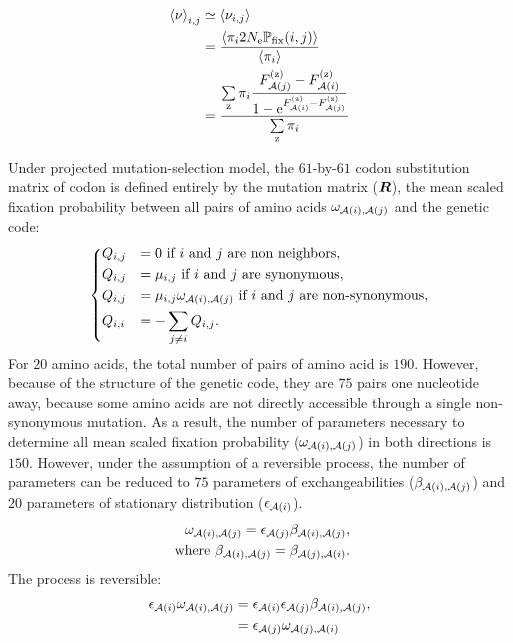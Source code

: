 \begin{align}
    \left\langle \nu \right\rangle_{{i}, {j}} & \simeq \left\langle \nu_{{i}, {j}} \right\rangle \\
    & = \dfrac{ \left\langle \pi_{{i}} 2N_{\textrm{e}} \mathbb{P}_{\mathrm{fix}}({i}, {j}) \right\rangle }{ \left\langle \pi_{{i}} \right\rangle } \\
    & = \dfrac{ \sum\limits_{\text{z}}  \pi_{{i}}\dfrac{F_{\mathcal{A}({j})}^{(\text{z})} - F_{\mathcal{A}({i})}^{(\text{z})}}{1 - \mathrm{e}^{F_{\mathcal{A}({i})}^{(\text{z})} - F_{\mathcal{A}({j})}^{(\text{z})}}} }{ \sum\limits_{\text{z}} \pi_{{i}} }
\end{align}

Under projected mutation-selection model, the $61$-by-$61$ codon substitution matrix of codon is defined entirely by the mutation matrix ($\bm{R}$), the mean scaled fixation probability between all pairs of amino acids $\omega_{\mathcal{A}({i}), \mathcal{A}({j})}$ and the genetic code:
\begin{equation}
    \begin{dcases}
        Q_{{i}, {j}} & = 0 \text{ if ${i}$ and ${j}$ are non neighbors}, \\
        Q_{{i}, {j}} & = \mu_{{i}, {j}} \text{ if ${i}$ and ${j}$ are synonymous}, \\
        Q_{{i}, {j}} & = \mu_{{i}, {j}} \omega_{\mathcal{A}({i}), \mathcal{A}({j})} \text{ if ${i}$ and ${j}$ are non-synonymous}, \\
        Q_{{i}, {i}} & = - \sum\limits_{{j} \neq {i}} Q_{{i}, {j}}.
    \end{dcases}
    \label{eq:codon-mean-field}
\end{equation}
For $20$ amino acids, the total number of pairs of amino acid is $190$.
However, because of the structure of the genetic code, they are $75$ pairs one nucleotide away, because some amino acids are not directly accessible through a single non-synonymous mutation.
As a result, the number of parameters necessary to determine all mean scaled fixation probability ($\omega_{\mathcal{A}({i}), \mathcal{A}({j})}$) in both directions is $150$.
However, under the assumption of a reversible process, the number of parameters can be reduced to $75$ parameters of exchangeabilities ($\beta_{\mathcal{A}({i}), \mathcal{A}({j})}$) and $20$ parameters of stationary distribution ($\epsilon_{\mathcal{A}({i})}$).
\begin{align}
    \omega_{\mathcal{A}({i}), \mathcal{A}({j})} = \epsilon_{\mathcal{A}({j})} \beta_{\mathcal{A}({i}), \mathcal{A}({j})}, \\
    \text{ where } \beta_{\mathcal{A}({i}), \mathcal{A}({j})} = \beta_{\mathcal{A}({j}), \mathcal{A}({i})}.
\end{align}
The process is reversible:
\begin{align}
    \epsilon_{\mathcal{A}({i})} \omega_{\mathcal{A}({i}), \mathcal{A}({j})} & = \epsilon_{\mathcal{A}({i})} \epsilon_{\mathcal{A}({j})} \beta_{\mathcal{A}({i}), \mathcal{A}({j})}, \\
    & = \epsilon_{\mathcal{A}({j})} \omega_{\mathcal{A}({j}), \mathcal{A}({i})}
\end{align}

